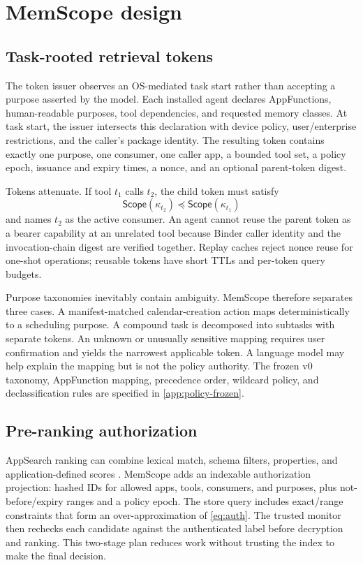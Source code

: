 \section{MemScope design}
\label{sec:method}

\subsection{Task-rooted retrieval tokens}

The token issuer observes an OS-mediated task start rather than accepting a purpose asserted by the model. Each installed agent declares AppFunctions, human-readable purposes, tool dependencies, and requested memory classes. At task start, the issuer intersects this declaration with device policy, user/enterprise restrictions, and the caller's package identity. The resulting token contains exactly one purpose, one consumer, one caller app, a bounded tool set, a policy epoch, issuance and expiry times, a nonce, and an optional parent-token digest.

Tokens attenuate. If tool $t_1$ calls $t_2$, the child token must satisfy
\begin{equation}
\mathsf{Scope}(\kappa_{t_2})\preceq\mathsf{Scope}(\kappa_{t_1})
\end{equation}
and names $t_2$ as the active consumer. An agent cannot reuse the parent token as a bearer capability at an unrelated tool because Binder caller identity and the invocation-chain digest are verified together. Replay caches reject nonce reuse for one-shot operations; reusable tokens have short TTLs and per-token query budgets.

Purpose taxonomies inevitably contain ambiguity. MemScope therefore separates three cases. A manifest-matched calendar-creation action maps deterministically to a scheduling purpose. A compound task is decomposed into subtasks with separate tokens. An unknown or unusually sensitive mapping requires user confirmation and yields the narrowest applicable token. A language model may help explain the mapping but is not the policy authority. The frozen v0 taxonomy, AppFunction mapping, precedence order, wildcard policy, and declassification rules are specified in \cref{app:policy-frozen}.

\subsection{Pre-ranking authorization}

AppSearch ranking can combine lexical match, schema filters, properties, and application-defined scores \citep{android2026appsearch}. MemScope adds an indexable authorization projection: hashed IDs for allowed apps, tools, consumers, and purposes, plus not-before/expiry ranges and a policy epoch. The store query includes exact/range constraints that form an over-approximation of \cref{eq:auth}. The trusted monitor then rechecks each candidate against the authenticated label before decryption and ranking. This two-stage plan reduces work without trusting the index to make the final decision.

